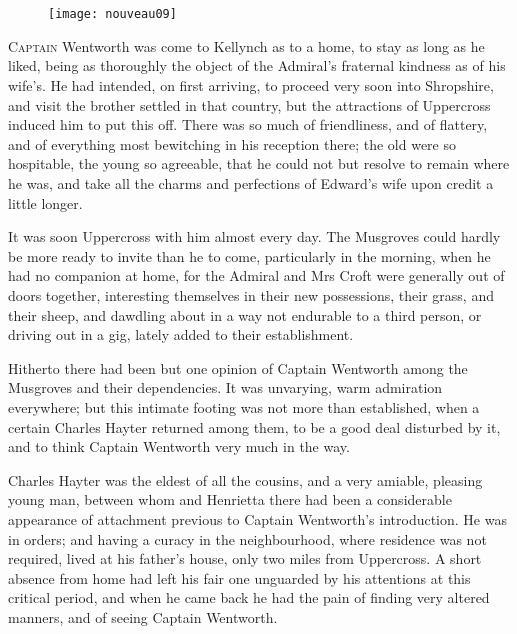 \chapter[Chapter \thechapter]{}

\begin{figure}[t!]
\centering
\texttt{[image: nouveau09]}
\end{figure}

\lettrine[lines=4,lraise=0.3]{C}{aptain} Wentworth was come to Kellynch as to a home, to stay as long as he liked, being as thoroughly the object of the Admiral's fraternal kindness as of his wife's. He had intended, on first arriving, to proceed very soon into Shropshire, and visit the brother settled in that country, but the attractions of Uppercross induced him to put this off. There was so much of friendliness, and of flattery, and of everything most bewitching in his reception there; the old were so hospitable, the young so agreeable, that he could not but resolve to remain where he was, and take all the charms and perfections of Edward's wife upon credit a little longer.

It was soon Uppercross with him almost every day. The Musgroves could hardly be more ready to invite than he to come, particularly in the morning, when he had no companion at home, for the Admiral and Mrs Croft were generally out of doors together, interesting themselves in their new possessions, their grass, and their sheep, and dawdling about in a way not endurable to a third person, or driving out in a gig, lately added to their establishment.

Hitherto there had been but one opinion of Captain Wentworth among the Musgroves and their dependencies. It was unvarying, warm admiration everywhere; but this intimate footing was not more than established, when a certain Charles Hayter returned among them, to be a good deal disturbed by it, and to think Captain Wentworth very much in the way.

Charles Hayter was the eldest of all the cousins, and a very amiable, pleasing young man, between whom and Henrietta there had been a considerable appearance of attachment previous to Captain Wentworth's introduction. He was in orders; and having a curacy in the neighbourhood, where residence was not required, lived at his father's house, only two miles from Uppercross. A short absence from home had left his fair one unguarded by his attentions at this critical period, and when he came back he had the pain of finding very altered manners, and of seeing Captain Wentworth.

